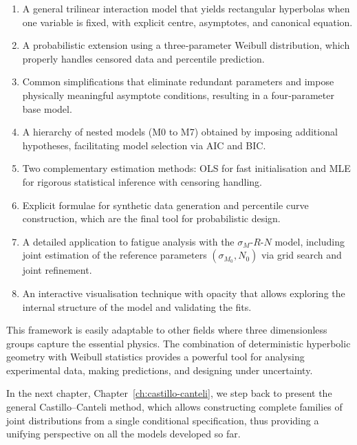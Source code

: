 \begin{enumerate}
    \item A general trilinear interaction model that yields rectangular hyperbolas when one variable is fixed, with explicit centre, asymptotes, and canonical equation.
    \item A probabilistic extension using a three‑parameter Weibull distribution, which properly handles censored data and percentile prediction.
    \item Common simplifications that eliminate redundant parameters and impose physically meaningful asymptote conditions, resulting in a four‑parameter base model.
    \item A hierarchy of nested models (M0 to M7) obtained by imposing additional hypotheses, facilitating model selection via AIC and BIC.
    \item Two complementary estimation methods: OLS for fast initialisation and MLE for rigorous statistical inference with censoring handling.
    \item Explicit formulae for synthetic data generation and percentile curve construction, which are the final tool for probabilistic design.
    \item A detailed application to fatigue analysis with the \(\sigma_M\)-\(R\)-\(N\) model, including joint estimation of the reference parameters \((\sigma_{M_0}, N_0)\) via grid search and joint refinement.
    \item An interactive visualisation technique with opacity that allows exploring the internal structure of the model and validating the fits.
\end{enumerate}

This framework is easily adaptable to other fields where three dimensionless groups capture the essential physics. The combination of deterministic hyperbolic geometry with Weibull statistics provides a powerful tool for analysing experimental data, making predictions, and designing under uncertainty.

In the next chapter, Chapter~\ref{ch:castillo-canteli}, we step back to present the general Castillo–Canteli method, which allows constructing complete families of joint distributions from a single conditional specification, thus providing a unifying perspective on all the models developed so far. 
